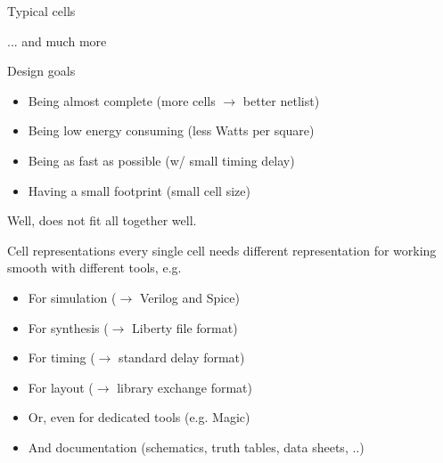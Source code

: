 \documentclass[aspectratio=169]{beamer}
\begin{document}
\begin{frame}{Typical cells}
	\begin{figure}[h]
		\begin{center}
			\begin{circuitdiagram}{25}{25}
			\end{circuitdiagram}
		\end{center}
	\end{figure}

... and much more
\end{frame}

\begin{frame}{Design goals}
	\begin{itemize}
        \setlength\itemsep{1em}
		\item Being almost complete (more cells $\rightarrow$ better netlist)
		\item Being low energy consuming (less Watts per square)
		\item Being as fast as possible (w/ small timing delay)
		\item Having a small footprint (small cell size)
	\end{itemize}

Well, does not fit all together well.
\end{frame}

\begin{frame}{Cell representations}
every single cell needs different representation for working smooth with different tools, e.g.
	\begin{itemize}
		\item For simulation ($\rightarrow$ Verilog and Spice)
		\item For synthesis ($\rightarrow$ Liberty file format)
		\item For timing ($\rightarrow$ standard delay format)
		\item For layout ($\rightarrow$ library exchange format)
		\item Or, even for dedicated tools (e.g. Magic)
		\item And documentation (schematics, truth tables, data sheets, ..)
	\end{itemize}
\end{frame}
\end{document}
